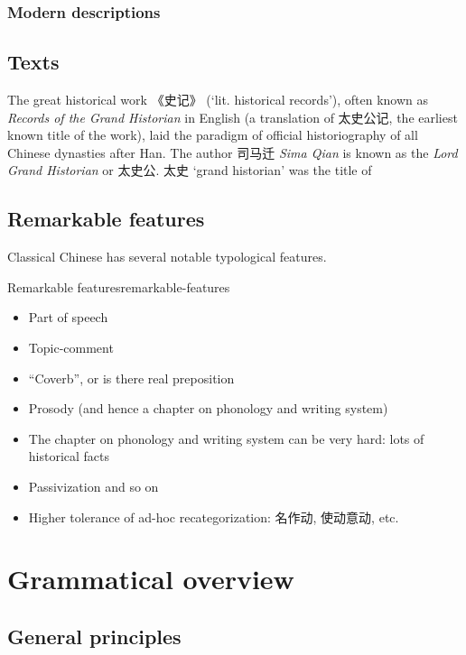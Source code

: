 \documentclass[UTF8, a4paper, oneside, scheme=plain, 12pt]{ctexrep}
\newcommand{\form}[1]{\emph{#1}}
\newcommand{\translate}[1]{`#1'}
\begin{document}
\subsection{Modern descriptions}\label{sec:introduction.previous.modern}

\section{Texts}\label{sec:introduction.text}

The great historical work 《史记》 (\translate{lit. historical records}),
often known as \form{Records of the Grand Historian} in English
(a translation of 太史公记, the earliest known title of the work),
laid the paradigm of official historiography of all Chinese dynasties after Han.
The author 司马迁 \form{Sima Qian} is known as the \form{Lord Grand Historian} or 太史公.
太史 \translate{grand historian} was the title of

\section{Remarkable features}

Classical Chinese has several notable typological features.

\begin{todobox}{Remarkable features}{remarkable-features}
    \begin{itemize}
        \item Part of speech
        \item Topic-comment
        \item ``Coverb'', or is there real preposition
        \item Prosody (and hence a chapter on phonology and writing system)
        \item The chapter on phonology and writing system can be very hard:
            lots of historical facts
        \item Passivization and so on
        \item Higher tolerance of ad-hoc recategorization: 名作动, 使动意动, etc.
    \end{itemize}
\end{todobox}

\chapter{Grammatical overview}\label{chap:grammatical}

\section{General principles}\label{sec:grammatical.intro}
\end{document}

